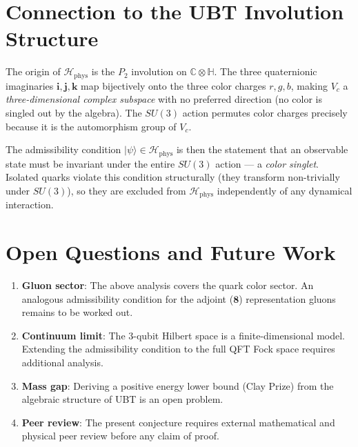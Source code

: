 \documentclass[12pt,a4paper]{article}
\newcommand{\Hphys}{\mathcal{H}_{\mathrm{phys}}}
\newcommand{\CCC}{\mathbb{C}}
\newcommand{\HH}{\mathbb{H}}
\newcommand{\ket}[1]{|#1\rangle}
\begin{document}
\section{Connection to the UBT Involution Structure}
\label{sec:connection}

The origin of $\Hphys$ is the $P_2$ involution on $\CCC \otimes \HH$.
The three quaternionic imaginaries $\mathbf{i},\mathbf{j},\mathbf{k}$ map
bijectively onto the three color charges $r,g,b$, making $V_c$ a
\emph{three-dimensional complex subspace} with no preferred direction
(no color is singled out by the algebra).  The $SU(3)$ action permutes color
charges precisely because it is the automorphism group of $V_c$.

The admissibility condition $\ket{\psi} \in \Hphys$ is then the statement that
an observable state must be invariant under the entire $SU(3)$ action — a
\emph{color singlet}.  Isolated quarks violate this condition structurally
(they transform non-trivially under $SU(3)$), so they are excluded from
$\Hphys$ independently of any dynamical interaction.

\section{Open Questions and Future Work}
\label{sec:open}

\begin{enumerate}
  \item \textbf{Gluon sector}: The above analysis covers the quark color sector.
    An analogous admissibility condition for the adjoint ($\mathbf{8}$)
    representation gluons remains to be worked out.
  \item \textbf{Continuum limit}: The 3-qubit Hilbert space is a finite-dimensional
    model.  Extending the admissibility condition to the full QFT Fock space
    requires additional analysis.
  \item \textbf{Mass gap}: Deriving a positive energy lower bound (Clay Prize) from
    the algebraic structure of UBT is an open problem.
  \item \textbf{Peer review}: The present conjecture requires external mathematical
    and physical peer review before any claim of proof.
\end{enumerate}
\end{document}
